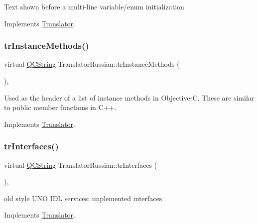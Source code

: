 Text shown before a multi-\/line variable/enum initialization 

Implements \mbox{\hyperlink{class_translator}{Translator}}.

\mbox{\label{class_translator_russian_a3c9b6607c87e4112ece637c8e87d3cc8}} 
\subsubsection{\texorpdfstring{trInstanceMethods()}{trInstanceMethods()}}
{\footnotesize\ttfamily virtual \mbox{\hyperlink{class_q_c_string}{Q\+C\+String}} Translator\+Russian\+::tr\+Instance\+Methods (\begin{DoxyParamCaption}{ }\end{DoxyParamCaption})\hspace{0.3cm}{\ttfamily [inline]}, {\ttfamily [virtual]}}

Used as the header of a list of instance methods in Objective-\/C. These are similar to public member functions in C++. 

Implements \mbox{\hyperlink{class_translator}{Translator}}.

\mbox{\label{class_translator_russian_a8c66ab88b08f3307ae38a3fff9cd5d86}} 
\subsubsection{\texorpdfstring{trInterfaces()}{trInterfaces()}}
{\footnotesize\ttfamily virtual \mbox{\hyperlink{class_q_c_string}{Q\+C\+String}} Translator\+Russian\+::tr\+Interfaces (\begin{DoxyParamCaption}{ }\end{DoxyParamCaption})\hspace{0.3cm}{\ttfamily [inline]}, {\ttfamily [virtual]}}

old style U\+NO I\+DL services\+: implemented interfaces 

Implements \mbox{\hyperlink{class_translator}{Translator}}.

\mbox{\label{class_translator_russian_a4dff38c677073722006bf9da5878a7f3}} 
